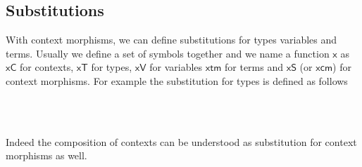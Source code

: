 \documentclass{acm_proc_article-sp}
\begin{document}
{\begin{code}
\\
\>[0]\<[8]%
\>[8]\AgdaSymbol{(} \AgdaSymbol{:} \AgdaSymbol{\{} \AgdaSymbol{:}  \AgdaSymbol{\}}      \AgdaSymbol{(} \AgdaSymbol{))}  \<[45]%
\>[45]\<%
\\
\>[0]\<[8]%
\>[8]   \<[14]%
\>[14]\<%
\\
\>[0]\<[6]%
\>[6]     \<%
\\
\>  \AgdaSymbol{(} \AgdaSymbol{\_)} \AgdaSymbol{=}  \AgdaSymbol{\_}\<%
\\
\>\<%
\end{code}
}


\subsection{Substitutions}

With context morphisms, we can define substitutions for types
variables and terms.  Usually we define a set of symbols together and
we name a function $\mathsf{x}$ as $\mathsf{xC}$ for contexts, $\mathsf{xT}$ for types, $\mathsf{xV}$ for
variables $\mathsf{xtm}$ for terms and $\mathsf{xS}$ (or $\mathsf{xcm}$) for context morphisms. For example
the substitution for types is defined as follows

\begin{code}%
\> \<[8]%
\>[8]\AgdaSymbol{:}  \AgdaSymbol{\}}          \<%
\\
\> \<[8]%
\>[8]\AgdaSymbol{:}   \AgdaSymbol{\}}     \AgdaSymbol{(} \AgdaSymbol{:}   \AgdaSymbol{)}   \AgdaSymbol{(} \AgdaFunction{[}  \AgdaFunction{]T}\AgdaSymbol{)}\<%
\\
\> \<[8]%
\>[8]\AgdaSymbol{:}   \AgdaSymbol{\}}     \AgdaSymbol{(} \AgdaSymbol{:}   \AgdaSymbol{)}   \AgdaSymbol{(} \AgdaFunction{[}  \AgdaFunction{]T}\AgdaSymbol{)} \<[59]%
\>[59]\<%
\end{code}
Indeed the
composition of contexts can be understood as substitution for context morphisms as well.
\end{document}

